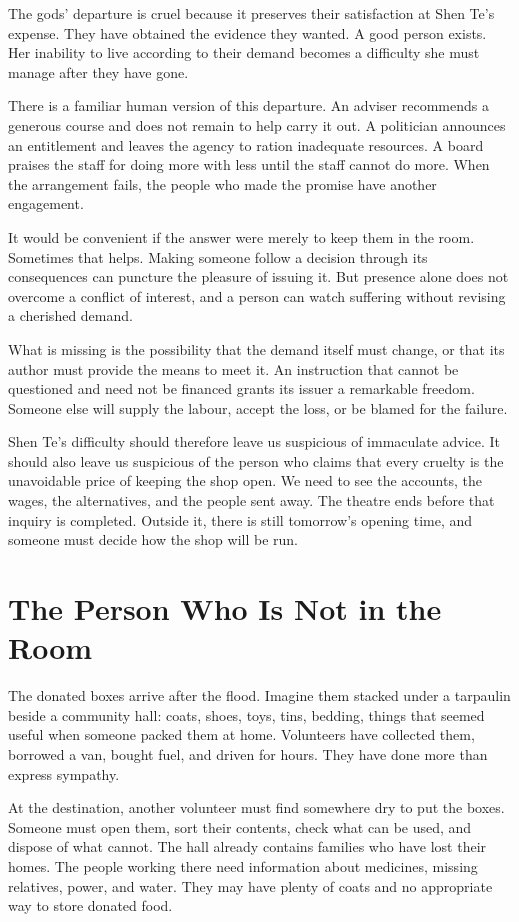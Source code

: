 \documentclass[12pt,a4paper]{book}
\begin{document}
The gods' departure is cruel because it preserves their satisfaction at Shen Te's expense. They have obtained the evidence they wanted. A good person exists. Her inability to live according to their demand becomes a difficulty she must manage after they have gone.

There is a familiar human version of this departure. An adviser recommends a generous course and does not remain to help carry it out. A politician announces an entitlement and leaves the agency to ration inadequate resources. A board praises the staff for doing more with less until the staff cannot do more. When the arrangement fails, the people who made the promise have another engagement.

It would be convenient if the answer were merely to keep them in the room. Sometimes that helps. Making someone follow a decision through its consequences can puncture the pleasure of issuing it. But presence alone does not overcome a conflict of interest, and a person can watch suffering without revising a cherished demand.

What is missing is the possibility that the demand itself must change, or that its author must provide the means to meet it. An instruction that cannot be questioned and need not be financed grants its issuer a remarkable freedom. Someone else will supply the labour, accept the loss, or be blamed for the failure.

Shen Te's difficulty should therefore leave us suspicious of immaculate advice. It should also leave us suspicious of the person who claims that every cruelty is the unavoidable price of keeping the shop open. We need to see the accounts, the wages, the alternatives, and the people sent away. The theatre ends before that inquiry is completed. Outside it, there is still tomorrow's opening time, and someone must decide how the shop will be run.

\chapter{The Person Who Is Not in the Room}

The donated boxes arrive after the flood. Imagine them stacked under a tarpaulin beside a community hall: coats, shoes, toys, tins, bedding, things that seemed useful when someone packed them at home. Volunteers have collected them, borrowed a van, bought fuel, and driven for hours. They have done more than express sympathy.

At the destination, another volunteer must find somewhere dry to put the boxes. Someone must open them, sort their contents, check what can be used, and dispose of what cannot. The hall already contains families who have lost their homes. The people working there need information about medicines, missing relatives, power, and water. They may have plenty of coats and no appropriate way to store donated food.
\end{document}
